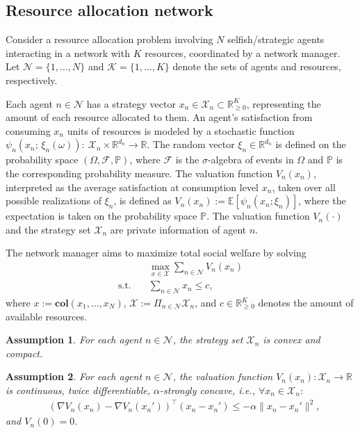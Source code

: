 \documentclass[twocolumn]{autart}
\newtheorem{assumption}{Assumption}
\begin{document}
\subsection{Resource allocation network}\label{resource_allocation_subsec}
Consider a resource allocation problem involving $N$ selfish/strategic agents interacting in a network with $K$ resources, coordinated by a network manager. Let $\mathcal{N}=\{1, \ldots, N\}$ and $\mathcal{K}=\{1, \ldots, K\}$ denote the sets of agents and resources, respectively.
\par 
Each agent $n\in\mathcal{N}$ has a strategy vector $x_n\in\mathcal{X}_n\subset\mathbb{R}_{\geq 0}^K$, representing the amount of each resource allocated to them. 
An agent's satisfaction from consuming $x_n$ units of resources is modeled by a stochastic function 
$
\psi_n(x_n;\,\xi_n(\omega)):\ \mathcal{X}_n \times \mathbb{R}^{d_n} \rightarrow \mathbb{R}
$.
The random vector \(\xi_n \in \mathbb{R}^{d_n}\) is defined on the probability space \((\Omega, \mathcal{F}, \mathbb{P})\), where \(\mathcal{F}\) is the \(\sigma\)-algebra of events in $\Omega$ and \(\mathbb{P}\) is the corresponding probability measure. The valuation function $V_n(x_n)$,
interpreted as the average satisfaction at consumption level $x_n$, taken over all possible realizations of $\xi_n$, is defined as $V_n(x_n):= \mathbb{E}[\psi_n(x_n;\xi_n)]$, where the expectation is taken on the probability space $\mathbb{P}$. The valuation function $V_n(\cdot)$ and the strategy set $\mathcal{X}_n$ are private information of agent $n$. 
\par
The network manager aims to maximize total social welfare by solving
\begin{subequations}\label{manager_problem_eq}
	\begin{align}
	  &\max_{x\in \mathcal{X}}{\sum_{n\in\mathcal{N}}{V_n(x_n)}}\\ 
	  \text{s.t.}\quad & \sum_{n\in\mathcal{N}}{x_n}\leq c,
	\end{align}
\end{subequations}
where $x:=\textbf{col}(x_1,\dots,x_N)$, $\mathcal{X}:=\Pi_{n\in \mathcal{N}}\mathcal{X}_n$, and $c\in\mathbb{R}_{\geq 0}^K$ denotes the amount of available resources.
\begin{assumption}\label{agent_set_assumption}
For each agent $n\in\mathcal{N}$, the strategy set $\mathcal{X}_n$ is convex and compact. 
\end{assumption}
\begin{assumption}\label{valuation_function_assumption}
For each agent $n\in\mathcal{N}$, the valuation function $V_n(x_n):\mathcal{X}_n\rightarrow \mathbb{R}$ is continuous, twice differentiable, $\alpha$-strongly concave, i.e., $\forall x_n\in \mathcal{X}_n:$
\begin{equation*}\label{alpha_concave_eq}
\begin{split}
    &(\nabla V_n(x_n)-\nabla V_n(x_n'))^\top(x_n-x_n')\leq-\alpha\|x_n-x_n'\|^2,
\end{split}
\end{equation*}
and $V_n(0)=0$.
\end{assumption}
\end{document}
